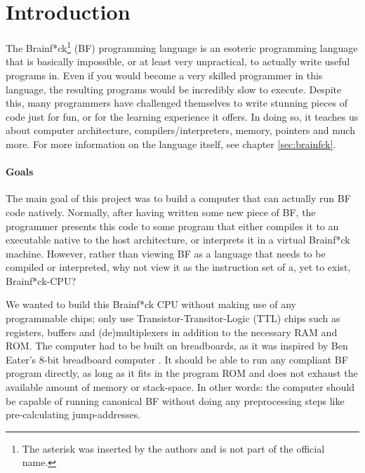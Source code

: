 \section{Introduction} \label{sec:introduction}
The Brainf*ck\footnote{The asterisk was inserted by the authors and is not part of the official name.} (BF) programming language is an esoteric programming language that is basically impossible, or at least very unpractical, to actually write useful programs in. Even if you would become a very skilled programmer in this language, the resulting programs would be incredibly slow to execute. Despite this, many programmers have challenged themselves to write stunning pieces of code just for fun, or for the learning experience it offers. In doing so, it teaches us about computer architecture, compilers/interpreters, memory, pointers and much more. For more information on the language itself, see chapter \ref{sec:brainfck}.

\paragraph{Goals} The main goal of this project was to build a computer that can actually run BF code natively. Normally, after having written some new piece of BF, the programmer presents this code to some program that either compiles it to an executable native to the host architecture, or interprets it in a virtual Brainf*ck machine. However, rather than viewing BF as a language that needs to be compiled or interpreted, why not view it as the instruction set of a, yet to exist, Brainf*ck-CPU?

We wanted to build this Brainf*ck CPU without making use of any programmable chips; only use Transistor-Transitor-Logic (TTL) chips such as registers, buffers and (de)multiplexers in addition to the necessary RAM and ROM. The computer had to be built on breadboards, as it was inspired by Ben Eater's 8-bit breadboard computer \cite{beneater}. It should be able to run any compliant BF program directly, as long as it fits in the program ROM and does not exhaust the available amount of memory or stack-space. In other words: the computer should be capable of running canonical BF without doing any preprocessing steps like pre-calculating jump-addresses.

